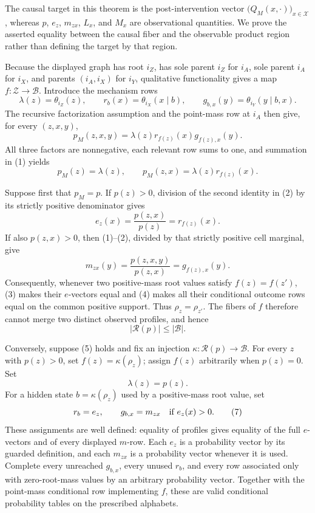 The causal target in this theorem is the post-intervention vector
\(\bigl(Q_M(x,\cdot)\bigr)_{x\in\mathcal X}\), whereas \(p\),
\(e_z\), \(m_{zx}\), \(L_x\), and \(M_x\) are observational
quantities.  We prove the asserted equality between the causal fiber and
the observable product region rather than defining the target by that
region.

Because the displayed graph has root \(i_Z\), has sole parent \(i_Z\)
for \(i_A\), sole parent \(i_A\) for \(i_X\), and parents
\((i_A,i_X)\) for \(i_Y\), qualitative functionality gives a map
\(f:\mathcal Z\to\mathcal B\).  Introduce the mechanism rows
\[
 \lambda(z)=\theta_{i_Z}(z),\qquad
 r_b(x)=\theta_{i_X}(x\mid b),\qquad
 g_{b,x}(y)=\theta_{i_Y}(y\mid b,x).
\]
The recursive factorization assumption and the point-mass row at
\(i_A\) then give, for every \((z,x,y)\),
\[
 p_M(z,x,y)=\lambda(z)r_{f(z)}(x)g_{f(z),x}(y).
\tag{1}
\]
All three factors are nonnegative, each relevant row sums to one, and
summation in (1) yields
\[
 p_M(z)=\lambda(z),\qquad
 p_M(z,x)=\lambda(z)r_{f(z)}(x).
\tag{2}
\]

Suppose first that \(p_M=p\).  If \(p(z)>0\), division of the second
identity in (2) by its strictly positive denominator gives
\[
 e_z(x)=\frac{p(z,x)}{p(z)}=r_{f(z)}(x).
\tag{3}
\]
If also \(p(z,x)>0\), then (1)--(2), divided by that strictly positive
cell marginal, give
\[
 m_{zx}(y)=\frac{p(z,x,y)}{p(z,x)}=g_{f(z),x}(y).
\tag{4}
\]
Consequently, whenever two positive-mass root values satisfy
\(f(z)=f(z')\), (3) makes their \(e\)-vectors equal and (4) makes all
their conditional outcome rows equal on the common positive support.
Thus \(\rho_z=\rho_{z'}\).  The fibers of \(f\) therefore cannot merge
two distinct observed profiles, and hence
\[
 \lvert\mathcal R(p)\rvert\leq\lvert\mathcal B\rvert.
\tag{5}
\]

Conversely, suppose (5) holds and fix an injection
\(\kappa:\mathcal R(p)\to\mathcal B\).  For every \(z\) with
\(p(z)>0\), set \(f(z)=\kappa(\rho_z)\); assign \(f(z)\) arbitrarily
when \(p(z)=0\).  Set
\[
 \lambda(z)=p(z).
\tag{6}
\]
For a hidden state \(b=\kappa(\rho_z)\) used by a positive-mass root
value, set
\[
 r_b=e_z,
 \qquad
 g_{b,x}=m_{zx}\quad\hbox{if }e_z(x)>0.
\tag{7}
\]
These assignments are well defined: equality of profiles gives equality
of the full \(e\)-vectors and of every displayed \(m\)-row.  Each
\(e_z\) is a probability vector by its guarded definition, and each
\(m_{zx}\) is a probability vector whenever it is used.  Complete every
unreached \(g_{b,x}\), every unused \(r_b\), and every row associated
only with zero-root-mass values by an arbitrary probability vector.
Together with the point-mass conditional row implementing \(f\), these
are valid conditional probability tables on the prescribed alphabets.

